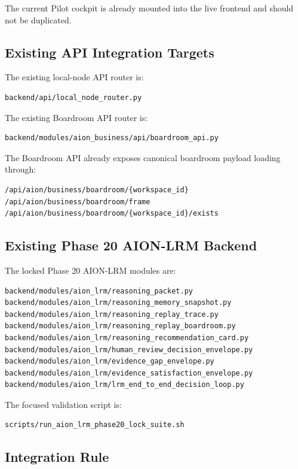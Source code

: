 The current Pilot cockpit is already mounted into the live frontend and should not be duplicated.

\subsection{Existing API Integration Targets}

The existing local-node API router is:

\begin{verbatim}
backend/api/local_node_router.py
\end{verbatim}

The existing Boardroom API router is:

\begin{verbatim}
backend/modules/aion_business/api/boardroom_api.py
\end{verbatim}

The Boardroom API already exposes canonical boardroom payload loading through:

\begin{verbatim}
/api/aion/business/boardroom/{workspace_id}
/api/aion/business/boardroom/frame
/api/aion/business/boardroom/{workspace_id}/exists
\end{verbatim}

\subsection{Existing Phase 20 AION-LRM Backend}

The locked Phase 20 AION-LRM modules are:

\begin{verbatim}
backend/modules/aion_lrm/reasoning_packet.py
backend/modules/aion_lrm/reasoning_memory_snapshot.py
backend/modules/aion_lrm/reasoning_replay_trace.py
backend/modules/aion_lrm/reasoning_replay_boardroom.py
backend/modules/aion_lrm/reasoning_recommendation_card.py
backend/modules/aion_lrm/human_review_decision_envelope.py
backend/modules/aion_lrm/evidence_gap_envelope.py
backend/modules/aion_lrm/evidence_satisfaction_envelope.py
backend/modules/aion_lrm/lrm_end_to_end_decision_loop.py
\end{verbatim}

The focused validation script is:

\begin{verbatim}
scripts/run_aion_lrm_phase20_lock_suite.sh
\end{verbatim}

\subsection{Integration Rule}

